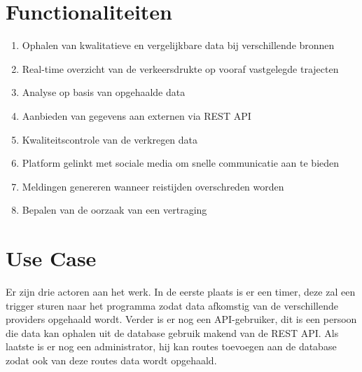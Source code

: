\documentclass[ps,a4paper,oneside]{report}
\begin{document}
\section{Functionaliteiten}
\begin{enumerate}
\item Ophalen van kwalitatieve en vergelijkbare data bij verschillende bronnen
\item Real-time overzicht van de verkeersdrukte op vooraf vastgelegde trajecten
\item Analyse op basis van opgehaalde data
\item Aanbieden van gegevens aan externen via REST API
\item Kwaliteitscontrole van de verkregen data
\item Platform gelinkt met sociale media om snelle communicatie aan te bieden
\item Meldingen genereren wanneer reistijden overschreden worden
\item Bepalen van de oorzaak van een vertraging
\end{enumerate}
\section{Use Case}
Er zijn drie actoren aan het werk. In de eerste plaats is er een timer, deze zal een trigger sturen naar het programma zodat data afkomstig van de verschillende providers opgehaald wordt. Verder is er nog een API-gebruiker, dit is een persoon die data kan ophalen uit de database gebruik makend van de REST API. Als laatste is er nog een administrator, hij kan routes toevoegen aan de database zodat ook van deze routes data wordt opgehaald.
\end{document}

